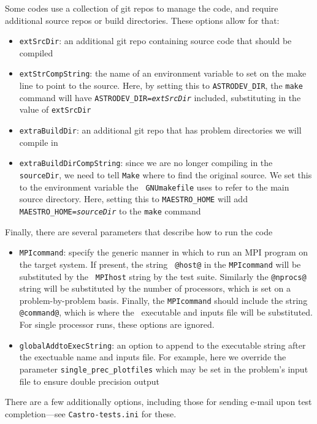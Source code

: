 Some codes use a collection of git repos to manage the code, and
require additional source repos or build directories.  These
options allow for that:
\begin{itemize}
\item {\tt extSrcDir}: an additional git repo containing source code
  that should be compiled
\item {\tt extStrCompString}: the name of an environment variable to
  set on the make line to point to the source.  Here, by setting
  this to {\tt ASTRODEV\_DIR}, the {\tt make} command will have
  {\tt ASTRODEV\_DIR=\itshape{extSrcDir}} included, substituting
  in the value of {\tt extSrcDir}
\item {\tt extraBuildDir}: an additional git repo that has problem
  directories we will compile in
\item {\tt extraBuildDirCompString}: since we are no longer compiling
  in the {\tt sourceDir}, we need to tell {\tt Make} where to find the
  original source.  We set this to the environment variable the {\tt
    GNUmakefile} uses to refer to the main source directory.  Here,
  setting this to {\tt MAESTRO\_HOME} will add {\tt
    MAESTRO\_HOME=\itshape{sourceDir}} to the {\tt make} command
\end{itemize}

Finally, there are several parameters that describe how to run the code
\begin{itemize}
\item {\tt MPIcommand}: specify the generic manner in which to run an
  MPI program on the target system.  If present, the string {\tt
    @host@} in the {\tt MPIcommand} will be substituted by the {\tt
    MPIhost} string by the test suite.  Similarly the {\tt @nprocs@}
  string will be substituted by the number of processors, which is set
  on a problem-by-problem basis.  Finally, the {\tt MPIcommand} should
  include the string {\tt @command@}, which is where the
  \maestro\ executable and inputs file will be substituted.  For
  single processor runs, these options are ignored.
\item {\tt globalAddtoExecString}: an option to append to the
  executable string after the exectuable name and inputs file.  For
  example, here we override the parameter {\tt single\_prec\_plotfiles}
  which may be set in the problem's input file to ensure double
  precision output
\end{itemize}

There are a few additionally options, including those for sending
e-mail upon test completion---see {\tt Castro-tests.ini} for these.


